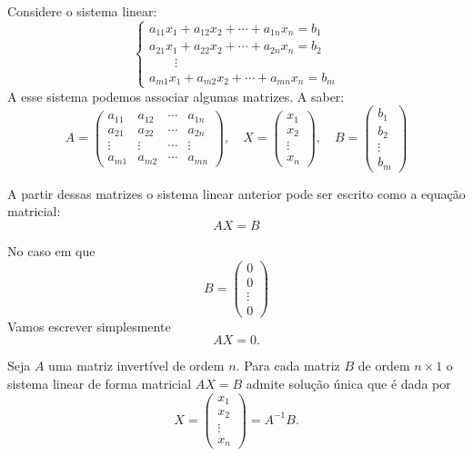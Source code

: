 Considere o sistema linear: 
\begin{equation}
\begin{cases}
        a_{11}x_1 + a_{12}x_2 + \cdots + a_{1n}x_n = b_1\\
        a_{21}x_1 + a_{22}x_2 + \cdots + a_{2n}x_n = b_2\\
        \qquad \vdots\\
        a_{m1}x_1 + a_{m2}x_2 + \cdots + a_{mn}x_n = b_m
    \end{cases}
\end{equation}
A esse sistema podemos associar algumas matrizes. A saber:
\[
    A = \begin{pmatrix}
        a_{11} & a_{12} & \cdots & a_{1n}\\
        a_{21} & a_{22} & \cdots & a_{2n}\\
        \vdots & \vdots & \cdots & \vdots\\
        a_{m1} & a_{m2} & \cdots & a_{mn}
    \end{pmatrix}, \quad
    X = \begin{pmatrix}
        x_1\\
        x_2\\
        \vdots\\
        x_n
    \end{pmatrix},\quad 
    B = \begin{pmatrix}
        b_1\\
        b_2\\
        \vdots\\
        b_m
    \end{pmatrix}
\]

A partir dessas matrizes o sistema linear anterior pode ser escrito como a equação matricial:
\[
    AX = B
\]

No caso em que
\[
    B = \begin{pmatrix}
        0\\0\\\vdots\\0
    \end{pmatrix}
\]
Vamos escrever simplesmente
\[
    AX = 0.
\]

\begin{teorema}
    Seja $A$ uma matriz invertível de ordem $n$. Para cada matriz $B$ de ordem $n\times 1$ o sistema linear de forma matricial
    $AX = B$ admite solução única que é dada por
    \[
        X = \begin{pmatrix}
            x_1 \\ x_2 \\ \vdots \\ x_n
        \end{pmatrix} = A^{-1}B.
    \]
\end{teorema}

